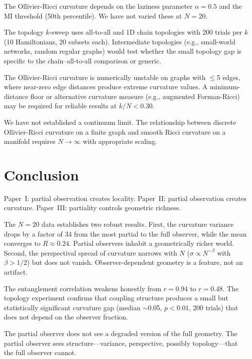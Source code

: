 \documentclass[aps,pra,twocolumn,superscriptaddress,floatfix]{revtex4-2}
\begin{document}
The Ollivier-Ricci curvature depends on the laziness parameter $\alpha = 0.5$ and the MI threshold (50th percentile).  We have not varied these at $N = 20$.

The topology $k$-sweep uses all-to-all and 1D chain topologies with 200 trials per $k$ (10 Hamiltonians, 20 subsets each).  Intermediate topologies (e.g., small-world networks, random regular graphs) would test whether the small topology gap is specific to the chain--all-to-all comparison or generic.

The Ollivier-Ricci curvature is numerically unstable on graphs with $\leq$5 edges, where near-zero edge distances produce extreme curvature values.  A minimum-distance floor or alternative curvature measure (e.g., augmented Forman-Ricci) may be required for reliable results at $k/N < 0.30$.

We have not established a continuum limit.  The relationship between discrete Ollivier-Ricci curvature on a finite graph and smooth Ricci curvature on a manifold requires $N \to \infty$ with appropriate scaling.


\section{Conclusion}
\label{sec:conclusion}

Paper~I: partial observation creates locality.  Paper~II: partial observation creates curvature.  Paper~III: partiality controls geometric richness.

The $N = 20$ data establishes two robust results.  First, the curvature variance drops by a factor of 34 from the most partial to the full observer, while the mean converges to $R \approx 0.24$.  Partial observers inhabit a geometrically richer world.  Second, the perspectival spread of curvature narrows with $N$ ($\sigma \propto N^{-\beta}$ with $\beta > 1/2$) but does not vanish.  Observer-dependent geometry is a feature, not an artifact.

The entanglement correlation weakens honestly from $r = 0.94$ to $r = 0.48$.  The topology experiment confirms that coupling structure produces a small but statistically significant curvature gap (median $\sim$0.05, $p < 0.01$, 200 trials) that does not depend on the observer fraction.

The partial observer does not see a degraded version of the full geometry.  The partial observer sees structure---variance, perspective, possibly topology---that the full observer cannot.
\end{document}
